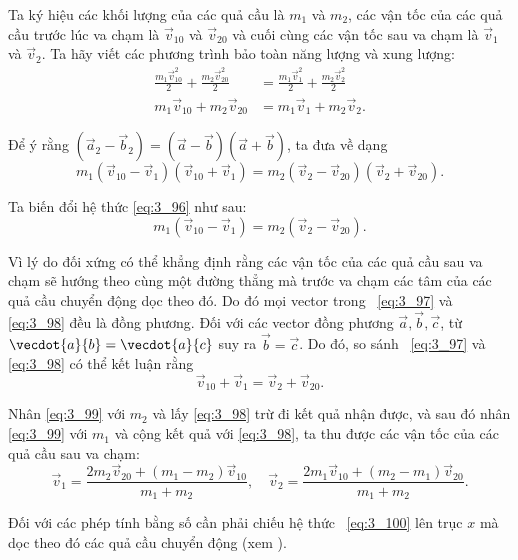 Ta ký hiệu các khối lượng của các quả cầu là $m_1$ và $m_2$, các vận tốc của các quả cầu trước lúc va chạm là $\vec{v}_{10}$ và $\vec{v}_{20}$ và cuối cùng các vận tốc sau va chạm là $\vec{v}_{1}$ và $\vec{v}_{2}$. Ta hãy viết các phương trình bảo toàn năng lượng và xung lượng:
\begin{align}
\frac{m_1\vec{v}_{10}^2}{2} + \frac{m_2\vec{v}_{20}^2}{2} &= \frac{m_1\vec{v}_{1}^2}{2} + \frac{m_2\vec{v}_{2}^2}{2}\label{eq:3_95}\\
m_1\vec{v}_{10} + m_2\vec{v}_{20} &= m_1\vec{v}_{1} + m_2\vec{v}_{2}.\label{eq:3_96}
\end{align}

\noindent
Để ý rằng  $(\vec{a}_2-\vec{b}_2)=(\vec{a}-\vec{b})(\vec{a}+\vec{b})$, ta đưa  về dạng
\begin{equation}\label{eq:3_97}
m_1(\vec{v}_{10}-\vec{v}_{1})(\vec{v}_{10}+\vec{v}_{1}) = m_2(\vec{v}_{2}-\vec{v}_{20})(\vec{v}_{2}+\vec{v}_{20}).
\end{equation}

\noindent
Ta biến đổi hệ thức \eqref{eq:3_96} như sau:
\begin{equation}\label{eq:3_98}
m_1(\vec{v}_{10}-\vec{v}_{1}) = m_2(\vec{v}_{2}-\vec{v}_{20}).
\end{equation}

Vì lý do đối xứng có thể khẳng định rằng các vận tốc của các quả cầu sau va chạm sẽ hướng theo cùng một đường thẳng mà trước va chạm các tâm của các quả cầu chuyển động dọc theo đó. Do đó mọi vector trong ~\eqref{eq:3_97} và \eqref{eq:3_98} đều là đồng phương. Đối với các vector đồng phương  $\vec{a}, \vec{b}, \vec{c}$, từ $\vecdot{a}{b}=\vecdot{a}{c}$ suy ra $\vec{b}=\vec{c}$. Do đó, so sánh ~\eqref{eq:3_97} và \eqref{eq:3_98} có thể kết luận rằng
\begin{equation}\label{eq:3_99}
\vec{v}_{10} + \vec{v}_{1} = \vec{v}_{2} + \vec{v}_{20}.
\end{equation}

\noindent
Nhân \eqref{eq:3_99} với $m_2$ và lấy \eqref{eq:3_98} trừ đi kết quả nhận được, và sau đó nhân \eqref{eq:3_99} với $m_1$ và cộng kết quả với  \eqref{eq:3_98}, ta thu được các vận tốc của các quả cầu sau va chạm:
\begin{equation}\label{eq:3_100}
\vec{v}_1 = \frac{2m_2\vec{v}_{20}+(m_1-m_2)\vec{v}_{10}}{m_1+m_2},\quad \vec{v}_2 = \frac{2m_1\vec{v}_{10}+(m_2-m_1)\vec{v}_{20}}{m_1+m_2}.
\end{equation}

\noindent
Đối với các phép tính bằng số cần phải chiếu hệ thức ~\eqref{eq:3_100} lên trục $x$ mà dọc theo đó các quả cầu chuyển động (xem ).

